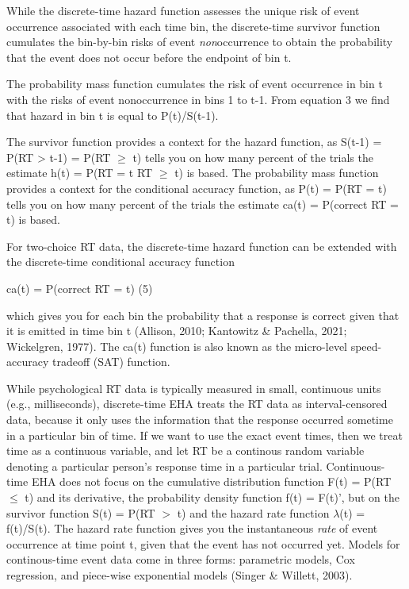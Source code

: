 \documentclass[
  man,floatsintext]{apa6}
\begin{document}
While the discrete-time hazard function assesses the unique risk of event occurrence associated with each time bin, the discrete-time survivor function cumulates the bin-by-bin risks of event \emph{non}occurrence to obtain the probability that the event does not occur before the endpoint of bin t.

The probability mass function cumulates the risk of event occurrence in bin t with the risks of event nonoccurrence in bins 1 to t-1. From equation 3 we find that hazard in bin t is equal to P(t)/S(t-1).

The survivor function provides a context for the hazard function, as S(t-1) = P(RT \textgreater{} t-1) = P(RT \(\geq\) t) tells you on how many percent of the trials the estimate h(t) = P(RT = t\textbar{} RT \(\geq\) t) is based. The probability mass function provides a context for the conditional accuracy function, as P(t) = P(RT = t) tells you on how many percent of the trials the estimate ca(t) = P(correct \textbar{} RT = t) is based.

For two-choice RT data, the discrete-time hazard function can be extended with the discrete-time conditional accuracy function

\noindent ca(t) = P(correct \textbar{} RT = t) \hfill  (5)

\noindent which gives you for each bin the probability that a response is correct given that it is emitted in time bin t (Allison, 2010; Kantowitz \& Pachella, 2021; Wickelgren, 1977). The ca(t) function is also known as the micro-level speed-accuracy tradeoff (SAT) function.

While psychological RT data is typically measured in small, continuous units (e.g., milliseconds), discrete-time EHA treats the RT data as interval-censored data, because it only uses the information that the response occurred sometime in a particular bin of time. If we want to use the exact event times, then we treat time as a continuous variable, and let RT be a continous random variable denoting a particular person's response time in a particular trial. Continuous-time EHA does not focus on the cumulative distribution function F(t) = P(RT \(\leq\) t) and its derivative, the probability density function f(t) = F(t)', but on the survivor function S(t) = P(RT \(>\) t) and the hazard rate function \(\lambda\)(t) = f(t)/S(t). The hazard rate function gives you the instantaneous \emph{rate} of event occurrence at time point t, given that the event has not occurred yet. Models for continous-time event data come in three forms: parametric models, Cox regression, and piece-wise exponential models (Singer \& Willett, 2003).
\end{document}

